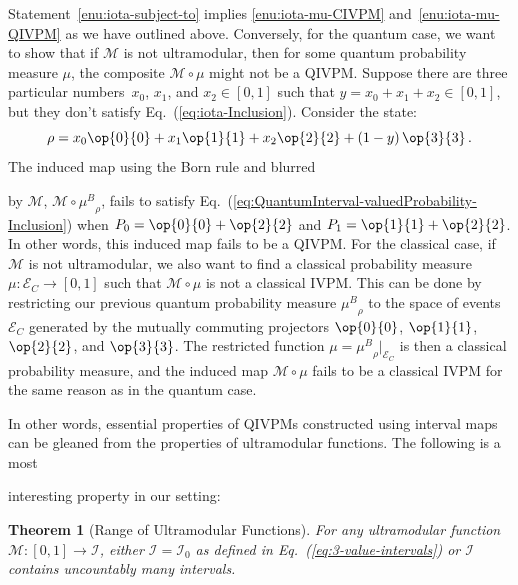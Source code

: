 \documentclass[english,reprint, aps, prl,superscriptaddress, showpacs,
showkeys, longbibliography, amsmath, amssymb, floatfix]{revtex4-1}
\theoremstyle{plain}
\newtheorem{thm}{Theorem}
\theoremstyle{definition}
\newcommand{\events}{\ensuremath{\mathcal{E}}}
\newcommand{\proj}[1]{\op{#1}{#1}}
\newcommand{\ultramodular}{\mathcal{M}}
\newcommand{\muB}{\ensuremath{\mu^{B}}}
\newcommand{\eventsC}{\ensuremath{\events_{C}}}
\newcommand{\says}[3]{\begin{framed}\begin{minipage}{0.9\linewidth}\color{#1}{#2 says: #3}\end{minipage}\end{framed}}
\newcommand{\yutsung}[1]{\says{purple}{Yu-Tsung}{#1}}
\begin{document}
Statement~\ref{enu:iota-subject-to} implies \ref{enu:iota-mu-CIVPM}
and~\ref{enu:iota-mu-QIVPM} as we have outlined above. Conversely, for the quantum case, we want
to show that if $\ultramodular$ is not ultramodular, then for
some quantum probability measure $\mu$, the composite
$\ultramodular\circ\mu$ might not be a QIVPM. Suppose there are three
particular numbers~$x_{0}$, $x_{1}$, and $x_{2}\in\left[0,1\right]$
such that $y=x_{0}+x_{1}+x_{2}\in\left[0,1\right]$, but they don't
satisfy Eq.~(\ref{eq:iota-Inclusion}). Consider the state:
\[
\rho=x_{0}\proj{0}+x_{1}\proj{1}+x_{2}\proj{2}+\left(1-y\right)\proj{3}\,.
\]
The induced map using the Born rule and blurred\yutsung{A ``blurred'' here.} by $\ultramodular$,
$\ultramodular\circ\muB_{\rho}$, fails to satisfy
Eq.~(\ref{eq:QuantumInterval-valuedProbability-Inclusion}) when
$P_{0}=\proj{0}+\proj{2}$ and $P_{1}=\proj{1}+\proj{2}$. In other
words, this induced map fails to be a QIVPM. For the classical case, if
$\ultramodular$ is not ultramodular, we also want to find a classical
probability measure $\mu:\eventsC\rightarrow\left[0,1\right]$ such
that $\ultramodular\circ\mu$ is not a classical IVPM. This can be
done by restricting our previous quantum probability measure
$\muB_{\rho}$ to the space of events  $\eventsC$  generated by the
mutually commuting projectors $\proj{0}$, $\proj{1}$, $\proj{2}$, and
$\proj{3}$.  The restricted function
$\mu=\muB_{\rho}|_{\eventsC}$ is then a classical probability
measure, and the induced map $\ultramodular\circ\mu$ fails to be
a classical IVPM for the same reason as in the quantum case.

In other words, essential properties of QIVPMs constructed using
interval maps can be gleaned from the properties of
ultramodular functions. The following is a most\yutsung{``a most''?} interesting property
in our setting{\color{red}:}

\begin{thm}[Range of Ultramodular Functions]\label{thm:convex-uncountable}For
any ultramodular function~$\ultramodular:\left[0,1\right]\rightarrow\mathscr{I}$,
either $\mathscr{I}=\mathscr{I}_{0}$ as defined in Eq.~(\ref{eq:3-value-intervals}) or
$\mathscr{I}$ contains uncountably many intervals.\end{thm}
\end{document}
